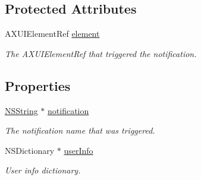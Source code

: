 \subsection*{Protected Attributes}
\begin{DoxyCompactItemize}
\item 
\hypertarget{interface_g_d_accessibility_notification_a8b20d367e858a860e134618752493f0c}{
AXUIElementRef \hyperlink{interface_g_d_accessibility_notification_a8b20d367e858a860e134618752493f0c}{element}}
\label{interface_g_d_accessibility_notification_a8b20d367e858a860e134618752493f0c}

\begin{DoxyCompactList}\small\item\em The AXUIElementRef that triggered the notification. \item\end{DoxyCompactList}\end{DoxyCompactItemize}
\subsection*{Properties}
\begin{DoxyCompactItemize}
\item 
\hypertarget{interface_g_d_accessibility_notification_a3a35ac62a068bf9ea55170e1abc55bc9}{
\hyperlink{class_n_s_string}{NSString} $\ast$ \hyperlink{interface_g_d_accessibility_notification_a3a35ac62a068bf9ea55170e1abc55bc9}{notification}}
\label{interface_g_d_accessibility_notification_a3a35ac62a068bf9ea55170e1abc55bc9}

\begin{DoxyCompactList}\small\item\em The notification name that was triggered. \item\end{DoxyCompactList}\item 
\hypertarget{interface_g_d_accessibility_notification_a0fd79497e2441128299e3f1f98324451}{
NSDictionary $\ast$ \hyperlink{interface_g_d_accessibility_notification_a0fd79497e2441128299e3f1f98324451}{userInfo}}
\label{interface_g_d_accessibility_notification_a0fd79497e2441128299e3f1f98324451}

\begin{DoxyCompactList}\small\item\em User info dictionary. \item\end{DoxyCompactList}\end{DoxyCompactItemize}


